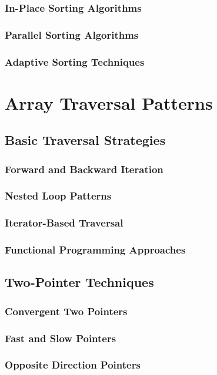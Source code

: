 \documentclass[12pt, oneside]{book}
\begin{document}
\subsubsection{In-Place Sorting Algorithms}
\subsubsection{Parallel Sorting Algorithms}
\subsubsection{Adaptive Sorting Techniques}

\section{Array Traversal Patterns}
\subsection{Basic Traversal Strategies}
\subsubsection{Forward and Backward Iteration}
\subsubsection{Nested Loop Patterns}
\subsubsection{Iterator-Based Traversal}
\subsubsection{Functional Programming Approaches}

\subsection{Two-Pointer Techniques}
\subsubsection{Convergent Two Pointers}
\subsubsection{Fast and Slow Pointers}
\subsubsection{Opposite Direction Pointers}
\end{document}
